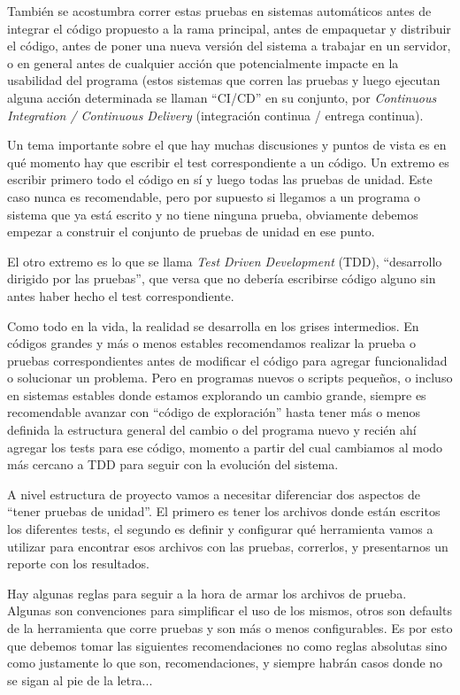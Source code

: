 También se acostumbra correr estas pruebas en sistemas automáticos antes de integrar el código propuesto a la rama principal, antes de empaquetar y distribuir el código, antes de poner una nueva versión del sistema a trabajar en un servidor, o en general antes de cualquier acción que potencialmente impacte en la usabilidad del programa (estos sistemas que corren las pruebas y luego ejecutan alguna acción determinada se llaman ``CI/CD'' en su conjunto, por \textit{Continuous Integration / Continuous Delivery} (integración continua / entrega continua).

Un tema importante sobre el que hay muchas discusiones y puntos de vista es en qué momento hay que escribir el test correspondiente a un código. Un extremo es escribir primero todo el código en sí y luego todas las pruebas de unidad. Este caso nunca es recomendable, pero por supuesto si llegamos a un programa o sistema que ya está escrito y no tiene ninguna prueba, obviamente debemos empezar a construir el conjunto de pruebas de unidad en ese punto.

El otro extremo es lo que se llama \textit{Test Driven Development} (TDD), ``desarrollo dirigido por las pruebas'', que versa que no debería escribirse código alguno sin antes haber hecho el test correspondiente. 

Como todo en la vida, la realidad se desarrolla en los grises intermedios. En códigos grandes y más o menos estables recomendamos realizar la prueba o pruebas correspondientes antes de modificar el código para agregar funcionalidad o solucionar un problema. Pero en programas nuevos o scripts pequeños, o incluso en sistemas estables donde estamos explorando un cambio grande, siempre es recomendable avanzar con ``código de exploración'' hasta tener más o menos definida la estructura general del cambio o del programa nuevo y recién ahí agregar los tests para ese código, momento a partir del cual cambiamos al modo más cercano a TDD para seguir con la evolución del sistema.

A nivel estructura de proyecto vamos a necesitar diferenciar dos aspectos de ``tener pruebas de unidad''. El primero es tener los archivos donde están escritos los diferentes tests, el segundo es definir y configurar qué herramienta vamos a utilizar para encontrar esos archivos con las pruebas, correrlos, y presentarnos un reporte con los resultados.

Hay algunas reglas para seguir a la hora de armar los archivos de prueba. Algunas son convenciones para simplificar el uso de los mismos, otros son defaults de la herramienta que corre pruebas y son más o menos configurables. Es por esto que debemos tomar las siguientes recomendaciones no como reglas absolutas sino como justamente lo que son, recomendaciones, y siempre habrán casos donde no se sigan al pie de la letra...

